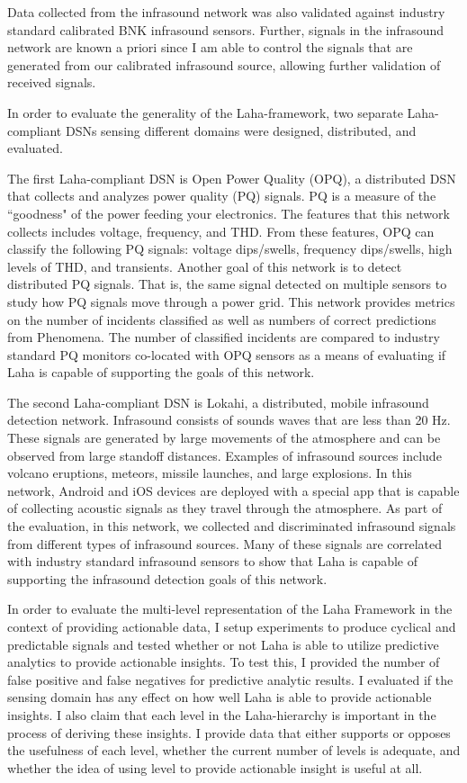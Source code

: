Data collected from the infrasound network was also validated against industry standard calibrated BNK infrasound sensors. Further, signals in the infrasound network are known a priori since I am able to control the signals that are generated from our calibrated infrasound source, allowing further validation of received signals.

In order to evaluate the generality of the Laha-framework, two separate Laha-compliant DSNs sensing different domains were designed, distributed, and evaluated.

The first Laha-compliant DSN is Open Power Quality (OPQ), a distributed DSN that collects and analyzes power quality (PQ) signals. PQ is a measure of the ``goodness" of the power feeding your electronics. The features that this network collects includes voltage, frequency, and THD. From these features, OPQ can classify the following PQ signals: voltage dips/swells, frequency dips/swells, high levels of THD, and transients. Another goal of this network is to detect distributed PQ signals. That is, the same signal detected on multiple sensors to study how PQ signals move through a power grid. This network provides metrics on the number of incidents classified as well as numbers of correct predictions from Phenomena. The number of classified incidents are compared to industry standard PQ monitors co-located with OPQ sensors as a means of evaluating if Laha is capable of supporting the goals of this network.

The second Laha-compliant DSN is Lokahi, a distributed, mobile infrasound detection network. Infrasound consists of sounds waves that are less than 20 Hz. These signals are generated by large movements of the atmosphere and can be observed from large standoff distances. Examples of infrasound sources include volcano eruptions, meteors, missile launches, and large explosions. In this network, Android and iOS devices are deployed with a special app that is capable of collecting acoustic signals as they travel through the atmosphere. As part of the evaluation, in this network, we collected and discriminated infrasound signals from different types of infrasound sources. Many of these signals are correlated with industry standard infrasound sensors to show that Laha is capable of supporting the infrasound detection goals of this network.

In order to evaluate the multi-level representation of the Laha Framework in the context of providing actionable data, I setup experiments to produce cyclical and predictable signals and tested whether or not Laha is able to utilize predictive analytics to provide actionable insights. To test this, I provided the number of false positive and false negatives for predictive analytic results. I evaluated if the sensing domain has any effect on how well Laha is able to provide actionable insights. I also claim that each level in the Laha-hierarchy is important in the process of deriving these insights. I provide data that either supports or opposes the usefulness of each level, whether the current number of levels is adequate, and whether the idea of using level to provide actionable insight is useful at all.

